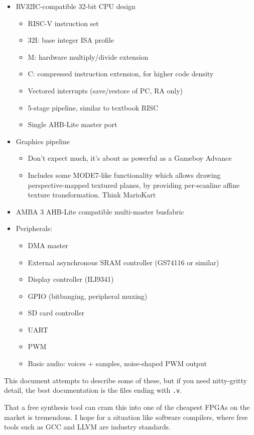 \begin{itemize}
\item RV32IC-compatible 32-bit CPU design
	\begin{itemize}
	\item RISC-V instruction set
	\item 32I: base integer ISA profile
	\item M: hardware multiply/divide extension
	\item C: compressed instruction extension, for higher code density
	\item Vectored interrupts (save/restore of PC, RA only)
	\item 5-stage pipeline, similar to textbook RISC
	\item Single AHB-Lite master port
	\end{itemize}
\item Graphics pipeline
	\begin{itemize}
	\item Don't expect much, it's about as powerful as a Gameboy Advance
	\item Includes some MODE7-like functionality which allows drawing perspective-mapped textured planes, by providing per-scanline affine texture transformation. Think MarioKart
	\end{itemize}
\item AMBA 3 AHB-Lite compatible multi-master busfabric
\item Peripherals:
	\begin{itemize}
	\item DMA master
	\item External asynchronous SRAM controller (GS74116 or similar)
	\item Display controller (ILI9341)
	\item GPIO (bitbanging, peripheral muxing)
	\item SD card controller
	\item UART
	\item PWM
	\item Basic audio: voices + samples, noise-shaped PWM output
	\end{itemize}
\end{itemize}

This document attempts to describe some of these, but if you need nitty-gritty detail, the best documentation is the files ending with {\tt .v}.

That a free synthesis tool can cram this into one of the cheapest FPGAs on the market is tremendous. I hope for a situation like software compilers, where free tools such as GCC and LLVM are industry standards.

